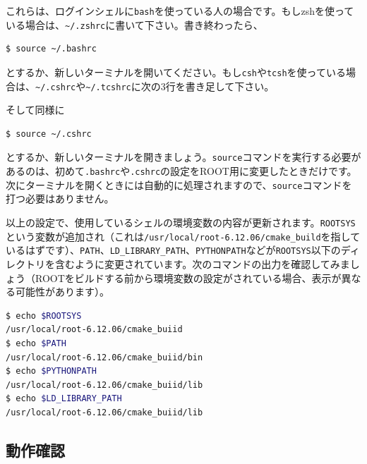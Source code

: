 これらは、ログインシェルに\texttt{bash}を使っている人の場合です。もしzshを使っている場合は、\texttt{\~{}/.zshrc}に書いて下さい。書き終わったら、
\begin{lstlisting}[language=bash]
$ source ~/.bashrc
\end{lstlisting}
とするか、新しいターミナルを開いてください。もし\texttt{csh}や\texttt{tcsh}を使っている場合は、\texttt{\~{}/.cshrc}や\texttt{\~{}/.tcshrc}に次の3行を書き足して下さい。
\begin{NoFloat}

\end{NoFloat}
そして同様に
\begin{lstlisting}[language=bash]
$ source ~/.cshrc
\end{lstlisting}
とするか、新しいターミナルを開きましょう。\texttt{source}コマンドを実行する必要があるのは、初めて\texttt{.bashrc}や\texttt{.cshrc}の設定をROOT用に変更したときだけです。次にターミナルを開くときには自動的に処理されますので、\texttt{source}コマンドを打つ必要はありません。

以上の設定で、使用しているシェルの環境変数の内容が更新されます。\texttt{ROOTSYS}という変数が追加され（これは\texttt{/usr/local/root-6.12.06/cmake\_build}を指しているはずです）、\texttt{PATH}、\texttt{LD\_LIBRARY\_PATH}、\texttt{PYTHONPATH}などが\texttt{ROOTSYS}以下のディレクトリを含むように変更されています。次のコマンドの出力を確認してみましょう（ROOTをビルドする前から環境変数の設定がされている場合、表示が異なる可能性があります）。
\begin{lstlisting}[language=bash]
$ echo $ROOTSYS
/usr/local/root-6.12.06/cmake_buiid
$ echo $PATH
/usr/local/root-6.12.06/cmake_buiid/bin
$ echo $PYTHONPATH
/usr/local/root-6.12.06/cmake_buiid/lib
$ echo $LD_LIBRARY_PATH
/usr/local/root-6.12.06/cmake_buiid/lib
\end{lstlisting}

\subsection{動作確認}

